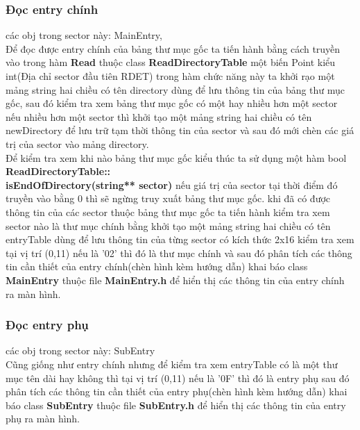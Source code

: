 \subsubsection{Đọc entry chính}
\noindent
các obj trong sector này: MainEntry, \\
\indent
Để đọc được entry chính của bảng thư mục gốc ta tiến hành bằng cách truyền vào trong hàm \textbf{Read} thuộc class \textbf{ReadDirectoryTable} một biến Point kiểu int(Địa chỉ sector đầu tiên RDET) trong hàm chức năng này ta khởi rạo một mảng string hai chiều có tên directory dùng để lưu thông tin của bảng thư mục gốc, sau đó kiểm tra xem bảng thư mục gốc có một hay nhiều hơn một sector nếu nhiều hơn một sector thì khởi tạo một mảng string hai chiều có tên newDirectory để lưu trữ tạm thời thông tin của sector và sau đó mới chèn các giá trị của sector vào mảng directory. \\
\indent
Để kiểm tra xem khi nào bảng thư mục gốc kiểu thúc ta sử dụng một hàm bool \textbf{ReadDirectoryTable::\\isEndOfDirectory(string** sector)} nếu giá trị của sector tại thời điểm đó truyền vào bằng 0 thì sẽ ngừng truy xuất bảng thư mục gốc.
khi đã có được thông tin của các sector thuộc bảng thư mục gốc ta tiến hành kiểm tra xem sector nào là thư mục chính bằng khởi tạo một mảng string hai chiều có tên entryTable dùng để lưu thông tin của từng sector có kích thức 2x16 kiểm tra xem tại vị trí (0,11) nếu là '02' thì đó là thư mục chính và sau đó phân tích các thông tin cần thiết của entry chính(chèn hình kèm hướng dẫn)  khai báo class \textbf{MainEntry} thuộc file \textbf{MainEntry.h} để hiển thị các thông tin của entry chính ra màn hình.\\
\subsubsection{Đọc entry phụ}
các obj trong sector này: SubEntry\\
Cũng giống như entry chính nhưng để kiểm tra xem entryTable có là một thư mục tên dài hay không thì tại vị trí (0,11) nếu là '0F' thì đó là entry phụ  sau đó phân tích các thông tin cần thiết của entry phụ(chèn hình kèm hướng dẫn)  khai báo class\textbf{ SubEntry} thuộc file \textbf{SubEntry.h} để hiển thị các thông tin của entry phụ ra màn hình.

